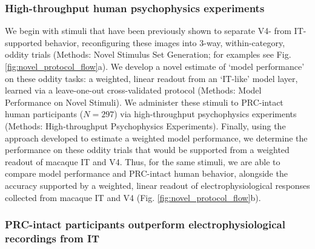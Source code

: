 \documentclass[11pt]{article}
\begin{document}
\subsubsection{High-throughput human psychophysics experiments}

We begin with stimuli that have been previously shown to separate V4- from IT-supported behavior\cite{majaj2015simple}, reconfiguring these images into 3-way, within-category, oddity trials (Methods: Novel Stimulus Set Generation; for examples see Fig. \ref{fig:novel_protocol_flow}a). We develop a novel estimate of `model performance' on these oddity tasks: a weighted, linear readout from an `IT-like' model layer, learned via a leave-one-out cross-validated protocol (Methods: Model Performance on Novel Stimuli). We administer these stimuli to PRC-intact human participants ($N=297$) via high-throughput psychophysics experiments (Methods: High-throughput Psychophysics Experiments). Finally, using the approach developed to estimate a weighted model performance, we determine the performance on these oddity trials that would be supported from a weighted readout of macaque IT and V4. Thus, for the same stimuli, we are able to compare model performance and PRC-intact human behavior, alongside the accuracy supported by a weighted, linear readout of electrophysiological responses collected from macaque IT and V4 (Fig. \ref{fig:novel_protocol_flow}b). 

\subsubsection{PRC-intact participants outperform electrophysiological recordings from IT}
\end{document}
